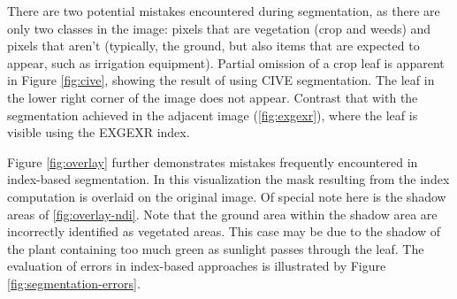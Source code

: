 \documentclass[letterpaper, notitlepage]{report}
\begin{document}
{There are two potential mistakes encountered during segmentation, as there are only two classes in the image: pixels that are vegetation (crop and weeds) and pixels that aren't (typically, the ground, but also items that are expected to appear, such as irrigation equipment). Partial omission of a crop leaf is apparent in Figure \ref{fig:cive}, showing the result of using \gls{CIVE} segmentation.  The leaf in the lower right corner of the image does not appear. Contrast that with the segmentation achieved in the adjacent image (\ref{fig:exgexr}), where the leaf is visible using the \gls{EXGEXR} index. 

Figure \ref{fig:overlay} further demonstrates mistakes frequently encountered in index-based segmentation.  In this visualization the mask resulting from the index computation is overlaid on the original  image. Of special note here is the shadow areas of \ref{fig:overlay-ndi}.  Note that the ground area within the shadow area are incorrectly identified as vegetated areas. This case may be due to the shadow of the plant containing too much green as sunlight passes through the leaf. The evaluation of errors in index-based approaches is illustrated by Figure \ref{fig:segmentation-errors}.

}
\end{document}
